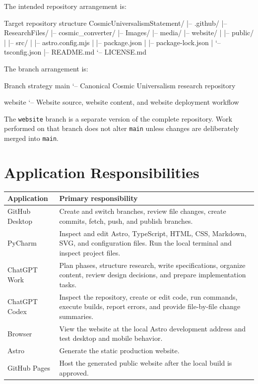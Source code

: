\documentclass[11pt,letterpaper]{article}
\newcommand{\branchname}[1]{\texttt{#1}}
\begin{document}
The intended repository arrangement is:

\begin{codebox}{Target repository structure}
CosmicUniversalismStatement/
|-- .github/
|-- ResearchFiles/
|-- cosmic_converter/
|-- Images/
|-- media/
|-- website/
|   |-- public/
|   |-- src/
|   |-- astro.config.mjs
|   |-- package.json
|   |-- package-lock.json
|   `-- tsconfig.json
|-- README.md
`-- LICENSE.md
\end{codebox}

The branch arrangement is:

\begin{codebox}{Branch strategy}
main
`-- Canonical Cosmic Universalism research repository

website
`-- Website source, website content, and website deployment workflow
\end{codebox}

\begin{safetybox}
The \branchname{website} branch is a separate version of the complete
repository. Work performed on that branch does not alter
\branchname{main} unless changes are deliberately merged into
\branchname{main}.
\end{safetybox}

\section{Application Responsibilities}

\begin{tabularx}{\textwidth}{L{1.55in}Y}
\toprule
\textbf{Application} & \textbf{Primary responsibility} \\
\midrule
GitHub Desktop &
Create and switch branches, review file changes, create commits,
fetch, push, and publish branches. \\

PyCharm &
Inspect and edit Astro, TypeScript, HTML, CSS, Markdown, SVG, and
configuration files. Run the local terminal and inspect project files. \\

ChatGPT Work &
Plan phases, structure research, write specifications, organize
content, review design decisions, and prepare implementation tasks. \\

ChatGPT Codex &
Inspect the repository, create or edit code, run commands, execute
builds, report errors, and provide file-by-file change summaries. \\

Browser &
View the website at the local Astro development address and test
desktop and mobile behavior. \\

Astro &
Generate the static production website. \\

GitHub Pages &
Host the generated public website after the local build is approved. \\
\bottomrule
\end{tabularx}
\end{document}
